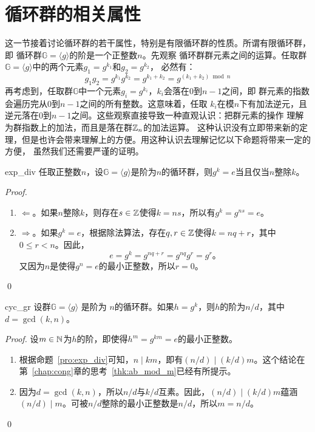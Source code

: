 \section{循环群的相关属性}
\label{sec:cyc_gr_prop}
这一节接着讨论循环群的若干属性，特别是有限循环群的性质。所谓有限循环群，即
循环群$\mathbb{G} = \langle g \rangle$的阶是一个正整数$n$。先观察
循环群群元素之间的运算。任取群$\mathbb{G} = \langle g \rangle$中的两个元素$g_1 = g^{k_1}$和$g_2 = g^{k_2}$，
必然有：
\[ g_1 g_2 = g^{k_1} g^{k_2} = g^{k_1 + k_2}= g^{(k_1 + k_2) \bmod n}\]
再考虑到，任取群$\mathbb{G}$中一个元素$g_i = g^{k_i}$，$k_i$会落在$0$到$n-1$之间，即
群元素的指数会遍历完从$0$到$n-1$之间的所有整数。这意味着，任取
$k_i$在模$n$下有加法逆元，且逆元落在$0$到$n-1$之间。这些观察直接导致一种直观认识：把群元素的操作
理解为群指数上的加法，而且是落在群${\mathbb Z}_n$的加法运算。
这种认识没有立即带来新的定理，但是也许会带来理解上的方便。用这种认识去理解记忆以下命题将带来一定的方便，
虽然我们还需要严谨的证明。
\begin{proposition}{}{exp_div}
	任取正整数$n$，设$\mathbb{G} = \langle g \rangle$是阶为$n$的循环群，则$g^k = e$当且仅当$n$整除$k$。		
\end{proposition}

	\begin{proof}
	\begin{enumerate}
	\item $\Leftarrow$。如果$n$整除$k$，则存在$s \in {\mathbb Z}$使得$k = ns$，所以有$g^k = g^{ns}=e$。
	
	\item $\Rightarrow$。如果$g^k = e$，根据除法算法，存在$q, r \in {\mathbb Z}$使得$k = nq +r$，其中$0 \leq r < n$。因此，
		\[e = g^k = g^{nq+r} = g^{nq} g^r = g^r\text{。}\]
		又因为$n$是使得$g^n = e$的最小正整数，所以$r = 0$。
	\end{enumerate}
\qed
    \end{proof}
\begin{proposition}{}{cyc_gr}
		设群$\mathbb{G} = \langle g \rangle$ 是阶为 $n$的循环群。如果$h = g^k$，则$h$的阶为$n/d$，其中$d=\gcd(k,n)$。
\end{proposition}
	
\begin{proof}
	设$m\in {\mathbb N}$为$h$的阶，即使得$h^m = g^{km} = e$的最小正整数。
			\begin{enumerate}
			\item 根据命题~\ref{pro:exp_div}可知，$n \mid km$，即有$(n/d) \mid (k/d)m$。这个结论在第~\ref{chap:cong}章的思考~\ref{thk:ab_mod_m}已经有所提示。
			
			\item 因为$d = \gcd(k,n)$，所以$n/d$与$k/d$互素。因此，$(n/d) \mid (k/d)m$蕴涵$(n/d) \mid m$。可被$n/d$整除的最小正整数是$n/d$，所以$m = n/d$。		
			\end{enumerate}  \qed
\end{proof}

